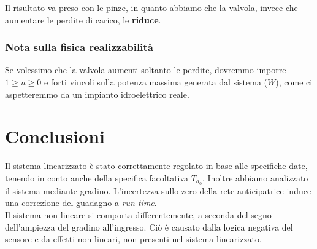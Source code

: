 \documentclass{article}
\begin{document}
Il risultato va preso con le pinze, in quanto abbiamo che la valvola, invece che aumentare le perdite di carico, le \textbf{riduce}.

\subsubsection{Nota sulla fisica realizzabilità}
Se volessimo che la valvola aumenti soltanto le perdite, dovremmo imporre $1\geq u \geq0$ e forti vincoli sulla potenza massima generata dal sistema ($W$), come ci aspetteremmo da un impianto idroelettrico reale.

\section{Conclusioni}

Il sistema linearizzato è stato correttamente regolato in base alle specifiche date, tenendo in conto anche della specifica facoltativa $T_{a_0}$. Inoltre abbiamo analizzato il sistema mediante gradino. L'incertezza sullo zero della rete anticipatrice induce una correzione del guadagno a \textit{run-time}.\\

Il sistema non lineare si comporta differentemente, a seconda del segno dell'ampiezza del gradino all'ingresso. Ciò è causato dalla logica negativa del sensore e da effetti non lineari, non presenti nel sistema linearizzato.
\end{document}
